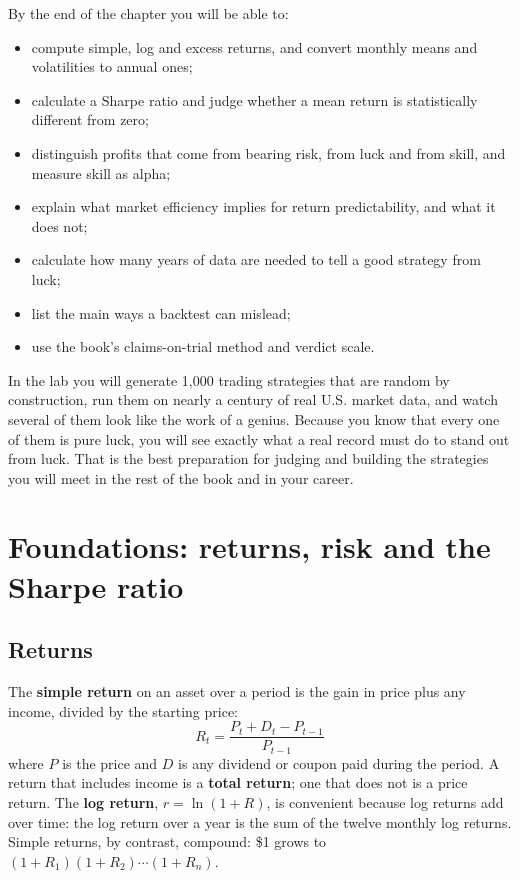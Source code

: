 By the end of the chapter you will be able to:

\begin{itemize}
  \item compute simple, log and excess returns, and convert monthly means and volatilities to annual ones;
  \item calculate a Sharpe ratio and judge whether a mean return is statistically different from zero;
  \item distinguish profits that come from bearing risk, from luck and from skill, and measure skill as alpha;
  \item explain what market efficiency implies for return predictability, and what it does not;
  \item calculate how many years of data are needed to tell a good strategy from luck;
  \item list the main ways a backtest can mislead;
  \item use the book's claims-on-trial method and verdict scale.
\end{itemize}

In the lab you will generate 1,000 trading strategies that are random by construction, run them on nearly a century of real U.S. market data, and watch several of them look like the work of a genius. Because you know that every one of them is pure luck, you will see exactly what a real record must do to stand out from luck. That is the best preparation for judging and building the strategies you will meet in the rest of the book and in your career.

\section{Foundations: returns, risk and the Sharpe ratio}
\label{sec:01-foundations}

\subsection{Returns}

The \textbf{simple return} on an asset over a period is the gain in price plus any income, divided by the starting price:
\begin{equation}
  R_t = \frac{P_t + D_t - P_{t-1}}{P_{t-1}}
  \label{eq:01-return}
\end{equation}
where $P$ is the price and $D$ is any dividend or coupon paid during the period. A return that includes income is a \textbf{total return}; one that does not is a price return. The \textbf{log return}, $r = \ln(1 + R)$, is convenient because log returns add over time: the log return over a year is the sum of the twelve monthly log returns. Simple returns, by contrast, compound: \$1 grows to $(1 + R_1)(1 + R_2)\cdots(1 + R_n)$.

